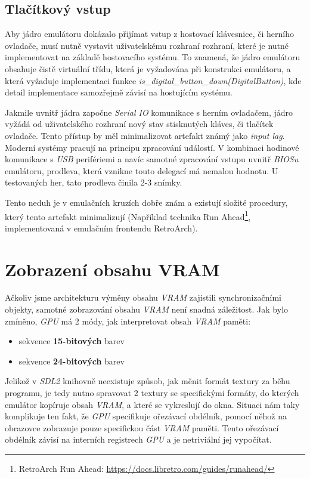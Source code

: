 \subsection{Tlačítkový vstup}

Aby jádro emulátoru dokázalo přijímat vstup z hostovací klávesnice, či herního ovladače, musí nutně vystavit uživatelskému rozhraní rozhraní, které je nutné implementovat
na základě hostovacího systému. To znamená, že jádro emulátoru obsahuje čistě virtuální třídu, která je vyžadována při konstrukci emulátoru,
a která vyžaduje implementaci funkce \textit{is\_digital\_button\_down(DigitalButton)}, kde detail implementace samozřejmě závisí na hostujícím systému.

Jakmile uvnitř jádra započne \textit{Serial IO} komunikace s herním ovladačem, jádro vyžádá od uživatelského rozhraní nový stav
stisknutých kláves, či tlačítek ovladače. Tento přístup by měl minimalizovat artefakt známý jako \textit{input lag}. Moderní systémy pracují na 
principu zpracování událostí. V kombinaci hodinové komunikace s \textit{USB} perifériemi a navíc samotné zpracování vstupu uvnitř \textit{BIOSu} emulátoru, prodleva, 
která vznikne touto delegací má nemalou hodnotu. U testovaných her, tato prodleva činila 2-3 snímky.

Tento neduh je v emulačních kruzích dobře znám a existují složité procedury, který tento artefakt minimalizují (Například technika Run Ahead\footnote{RetroArch Run Ahead: \url{https://docs.libretro.com/guides/runahead/}}, implementovaná v emulačním frontendu RetroArch).

\section{Zobrazení obsahu VRAM}

Ačkoliv jsme architekturu výměny obsahu \textit{VRAM} zajistili synchronizačními objekty, samotné zobrazování obsahu \textit{VRAM} není snadná záležitost.
Jak bylo zmíněno, \textit{GPU} má 2 módy, jak interpretovat obsah \textit{VRAM} paměti: 

\begin{itemize}
    \item{sekvence \textbf{15-bitových} barev}
    \item{sekvence \textbf{24-bitových} barev}
\end{itemize}

Jelikož v \textit{SDL2} knihovně neexistuje způsob, jak měnit formát textury za běhu programu, je tedy nutno spravovat 2 textury se specifickými formáty,
do kterých emulátor kopíruje obsah \textit{VRAM}, a které se vykreslují do okna. Situaci nám taky komplikuje ten fakt, že \textit{GPU} specifikuje
ořezávací obdélník, pomocí něhož na obrazovce zobrazuje pouze specifickou část \textit{VRAM} paměti. Tento ořezávací obdélník závisí na interních registrech
\textit{GPU} a je netriviální jej vypočítat.

